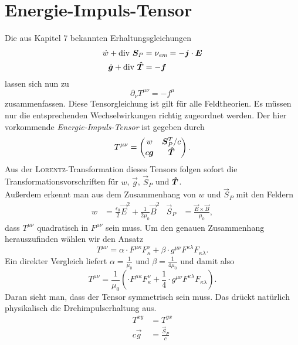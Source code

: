 \section{Energie-Impuls-Tensor}

Die aus Kapitel 7 bekannten Erhaltungsgleichungen
\begin{align*}
\dot{w}+\text{div }\bm{S}_P &= \nu_\textit{em} = -\bm{j}\cdot\bm{E}\\
\dot{\bm{g}} + \text{div }\bm{\hat{T}} &= -\bm{f}
\end{align*} 
lassen sich nun zu
\begin{equation*}
\partial_\nu T^{\mu\nu}= -f^\mu
\end{equation*}
zusammenfassen. Diese Tensorgleichung ist gilt für alle Feldtheorien. Es müssen nur die entsprechenden Wechselwirkungen richtig zugeordnet werden. Der hier vorkommende \emph{Energie-Impuls-Tensor} ist gegeben durch
\begin{equation*}
T^{\mu\nu} = \begin{pmatrix}
w & \bm{S}_P^T/c\\
c\bm{g} & \bm{\hat{T}}
\end{pmatrix}.
\end{equation*}
Aus der \textsc{Lorentz}-Transformation dieses Tensors folgen sofort die Transformationsvorschriften für $w$, $\vec{g}$, $\vec{S}_P$ und $\bm{\hat{T}}$.\\
Außerdem erkennt man aus dem Zusammenhang von $w$ und $\vec{S}_P$ mit den Feldern
\begin{align*}
w &= \frac{\epsilon_0}{2}\vec{E}^2 + \frac{1}{2\mu_0}\vec{B}^2 &\vec{S}_P &=\frac{\vec{E}\times\vec{B}}{\mu_0}, 
\end{align*}
dass $T^{\mu\nu}$ quadratisch in $F^{\mu\nu}$ sein muss. Um den genauen Zusammenhang herauszufinden wählen wir den Ansatz
\begin{equation*}
T^{\mu\nu} = \alpha\cdot F^{\mu\kappa} F_\kappa^\nu + \beta\cdot g^{\mu\nu} F^{\kappa\lambda} F_{\kappa\lambda}.
\end{equation*}
Ein direkter Vergleich liefert $\alpha = \frac{1}{\mu_0}$ und $\beta = \frac{1}{4\mu_0}$ und damit also
\begin{equation*}
T^{\mu\nu} = \frac{1}{\mu_0}\left(\cdot F^{\mu\kappa} F_\kappa^\nu + \frac{1}{4}\cdot g^{\mu\nu} F^{\kappa\lambda} F_{\kappa\lambda}\right).
\end{equation*}
Daran sieht man, dass der Tensor symmetrisch sein muss. Das drückt natürlich physikalisch die Drehimpulserhaltung aus.
\begin{align*}
T^{xy}&=T^{yx}\\
c\vec{g} & =\frac{\vec{S}_P}{c}
\end{align*}
